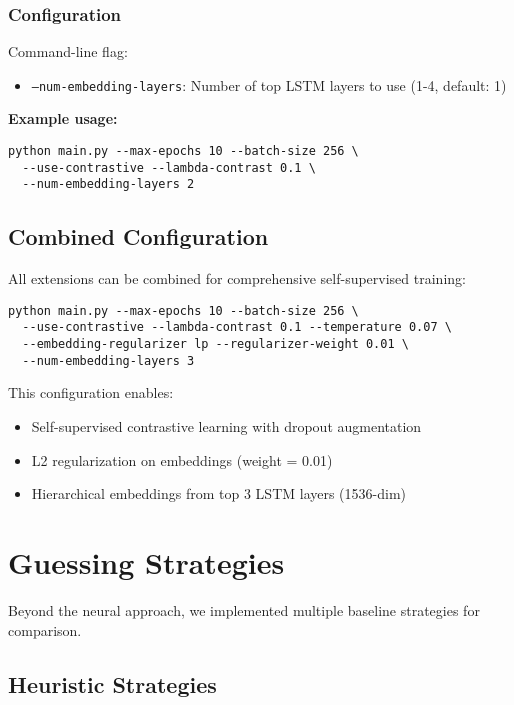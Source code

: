 \documentclass[12pt,a4paper]{article}
\begin{document}
\subsubsection{Configuration}

Command-line flag:
\begin{itemize}
    \item \texttt{--num-embedding-layers}: Number of top LSTM layers to use (1-4, default: 1)
\end{itemize}

\textbf{Example usage:}
\begin{verbatim}
python main.py --max-epochs 10 --batch-size 256 \
  --use-contrastive --lambda-contrast 0.1 \
  --num-embedding-layers 2
\end{verbatim}

\subsection{Combined Configuration}

All extensions can be combined for comprehensive self-supervised training:

\begin{verbatim}
python main.py --max-epochs 10 --batch-size 256 \
  --use-contrastive --lambda-contrast 0.1 --temperature 0.07 \
  --embedding-regularizer lp --regularizer-weight 0.01 \
  --num-embedding-layers 3
\end{verbatim}

This configuration enables:
\begin{itemize}
    \item Self-supervised contrastive learning with dropout augmentation
    \item L2 regularization on embeddings (weight = 0.01)
    \item Hierarchical embeddings from top 3 LSTM layers (1536-dim)
\end{itemize}

\section{Guessing Strategies}

Beyond the neural approach, we implemented multiple baseline strategies for comparison.

\subsection{Heuristic Strategies}
\end{document}
